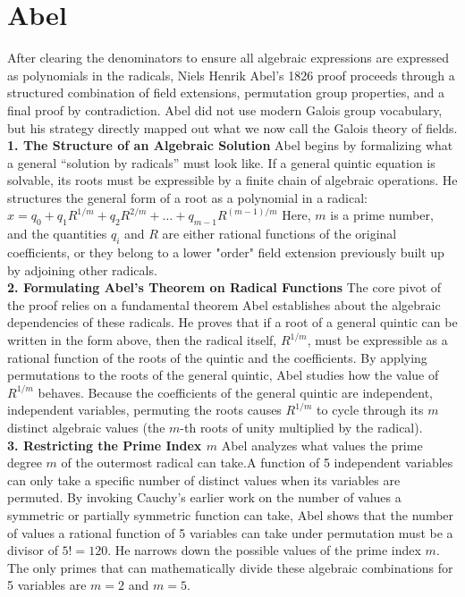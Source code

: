 \section{Abel}

After clearing the denominators to ensure all algebraic expressions are expressed as polynomials in the radicals, Niels Henrik Abel's 1826 proof proceeds through a structured combination of field extensions, 
permutation group properties, and a final proof by contradiction.
Abel did not use modern Galois group vocabulary, but his strategy directly mapped out what we now call the Galois theory of fields.\\

{\bf 1. The Structure of an Algebraic Solution}
Abel begins by formalizing what a general ``solution by radicals'' must look like. 
If a general quintic equation is solvable, its roots must be expressible by a finite chain of algebraic operations. 
He structures the general form of a root as a polynomial in a radical:\(x=q_{0}+q_{1}R^{1/m}+q_{2}R^{2/m}+\dots +q_{m-1}R^{(m-1)/m}\)
Here, \(m\) is a prime number, and the quantities \(q_{i}\) and \(R\) are either rational functions of the original coefficients, or they belong to a lower "order" field extension previously built up by adjoining other radicals.\\

{\bf 2. Formulating Abel's Theorem on Radical Functions}
The core pivot of the proof relies on a fundamental theorem Abel establishes about the algebraic dependencies of these radicals. 
He proves that if a root of a general quintic can be written in the form above, then the radical itself,
 \(R^{1/m}\), must be expressible as a rational function of the roots of the quintic and the coefficients.
 By applying permutations to the roots of the general quintic, Abel studies how the value of \(R^{1/m}\) behaves. 
 Because the coefficients of the general quintic are independent, independent variables, permuting the roots causes \(R^{1/m}\) to cycle through its \(m\) distinct algebraic values (the \(m\)-th roots of unity multiplied by the radical).\\

 {\bf 3. Restricting the Prime Index \(m\)}
 Abel analyzes what values the prime degree \(m\) of the outermost radical can take.A function of 5 independent variables can only take a specific number of distinct values when its variables are permuted.
 By invoking Cauchy's earlier work on the number of values a symmetric or partially symmetric function can take, Abel shows that the number of values a rational function of 5 variables can take under permutation 
 must be a divisor of \(5! = 120\).
 He narrows down the possible values of the prime index \(m\). 
 The only primes that can mathematically divide these algebraic combinations for 5 variables are \(m = 2\) and \(m = 5\).\\

